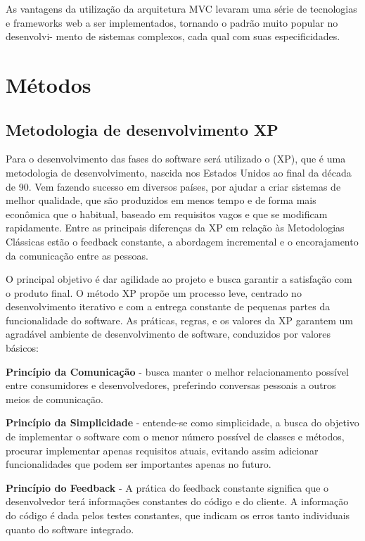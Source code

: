 \documentclass{automatextcc}
\begin{document}
As vantagens da utilização da arquitetura MVC levaram uma série de tecnologias e frameworks web a ser implementados, tornando o padrão muito popular no desenvolvi- mento de sistemas complexos, cada qual com suas especificidades.


\section{Métodos}

\subsection{Metodologia de desenvolvimento XP}

Para o desenvolvimento das fases do software será utilizado o  (XP), que é uma metodologia de desenvolvimento, nascida nos Estados Unidos ao final da década de 90. Vem fazendo sucesso em diversos países, por ajudar a criar sistemas de melhor qualidade, que são produzidos em menos tempo e de forma mais econômica que o habitual, baseado em requisitos vagos e que se modificam rapidamente. Entre as principais diferenças da XP em relação às Metodologias Clássicas estão o feedback constante, a abordagem incremental e o encorajamento da comunicação entre as pessoas.


O principal objetivo é dar agilidade ao projeto e busca garantir a satisfação com o produto final.  O método XP propõe um processo leve, centrado no desenvolvimento iterativo e com a entrega constante de pequenas partes da funcionalidade do software. As práticas, regras, e os valores da XP garantem um agradável ambiente de desenvolvimento de software, conduzidos por valores básicos:


 \textbf{Princípio da Comunicação} - busca manter o melhor relacionamento possível entre consumidores e desenvolvedores, preferindo conversas pessoais a outros meios de comunicação.
 
 
\textbf{Princípio da Simplicidade} - entende-se como simplicidade, a busca do objetivo de implementar o software com o menor número possível de classes e métodos, procurar implementar apenas requisitos atuais, evitando assim adicionar funcionalidades que podem ser importantes apenas no futuro.  


\textbf{Princípio do Feedback} - A prática do feedback constante significa que o desenvolvedor terá informações constantes do código e do cliente. A informação do código é dada pelos testes constantes, que indicam os erros tanto individuais quanto do software integrado.
\end{document}
